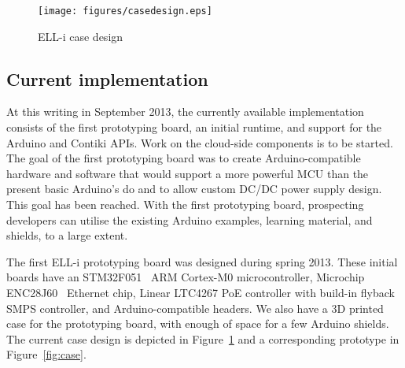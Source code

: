 \documentclass{siamltex}
\begin{document}
\begin{figure}
\centering
\texttt{[image: figures/casedesign.eps]}
\caption{ELL-i case design}
\label{fig:casedesign}
\end{figure}

\subsection{Current implementation}

At this writing in September 2013, the currently available
implementation consists of the first prototyping board, an initial
runtime, and support for the Arduino and Contiki APIs.  Work on the cloud-side
components is to be started.
The goal of the first prototyping board was to create
Arduino-compatible hardware and software that would support a more
powerful
MCU than the present basic Arduino's do and to allow custom DC/DC
power supply design.  This goal has been reached.  With the first
prototyping board, prospecting developers can utilise the existing
Arduino examples, learning material, and shields, to a large extent.

The first ELL-i prototyping board was designed during spring 2013.  
These initial
boards have an STM32F051~\cite{STM32F051} ARM Cortex-M0
microcontroller, Microchip ENC28J60~\cite{ENC28J60} Ethernet chip,
Linear LTC4267 PoE controller with build-in flyback SMPS controller,
and Arduino-compatible headers.  We also have a 3D printed case for
the prototyping board, with enough of space for a few Arduino shields.
The current case design is depicted in Figure~\ref{fig:casedesign} and
a corresponding prototype in Figure~\ref{fig:case}.


\end{document}
